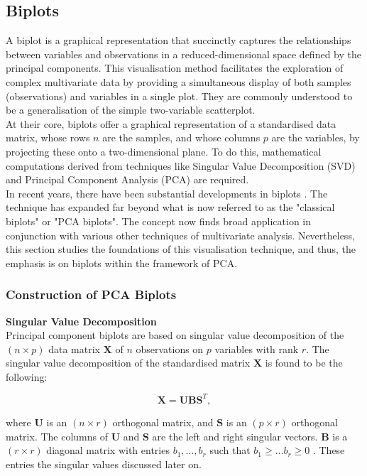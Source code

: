 \documentclass{article}\usepackage[]{graphicx}\usepackage[]{xcolor}
\numberwithin{equation}{section}
\begin{document}
\subsection{Biplots}
\noindent 
A biplot is a graphical representation that succinctly captures the relationships between variables and observations in a reduced-dimensional space defined by the principal components. This visualisation method facilitates the exploration of complex multivariate data by providing a simultaneous display of both samples (observations) and variables in a single plot. They are commonly understood to be a generalisation of the simple two-variable scatterplot.\\

\noindent At their core, biplots offer a graphical representation of a standardised data matrix, whose rows \(n\) are the samples, and whose columns \(p\) are the variables, by projecting these onto a two-dimensional plane. To do this, mathematical computations derived from techniques like Singular Value Decomposition (SVD) and Principal Component Analysis (PCA) are required.\\

\noindent In recent years, there have been substantial developments in biplots \cite{gower1995biplots}. The technique has expanded far beyond what is now referred to as the "classical biplots" or "PCA biplots". The concept now finds broad application in conjunction with various other techniques of multivariate analysis. Nevertheless, this section studies the foundations of this visualisation technique, and thus, the emphasis is on biplots within the framework of PCA.

\subsubsection{Construction of PCA Biplots}

\noindent \textbf{Singular Value Decomposition}\\
\noindent Principal component biplots are based on singular value decomposition of the $(n \times p)$ data matrix $\mathbf{X}$ of $n$ observations on $p$ variables with rank $r$. The singular value decomposition of the standardised matrix $\mathbf{X}$ is found to be the following:

\[\mathbf{X} = \mathbf{U}\mathbf{B}\mathbf{S}^{T}, \]

\noindent where $\mathbf{U}$ is an $(n \times r)$ orthogonal matrix, and $\mathbf{S}$ is an $(p \times r)$ orthogonal matrix. The columns of $\mathbf{U}$ and $\mathbf{S}$ are the left and right singular vectors. $\mathbf{B}$ is a $(r \times r)$ diagonal matrix with entries $b_1, \ldots, b_r$ such that $b_1 \geq \dots b_r \geq 0$ \cite{jolliffe2003principal}. These entries the singular values discussed later on.\\
\end{document}
